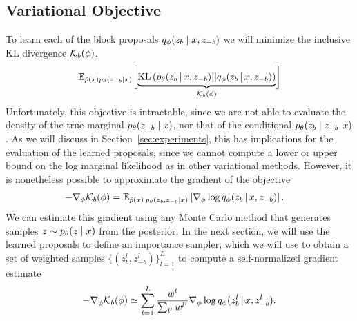 \documentclass{article}
\theoremstyle{definition}
\begin{document}
\subsection{Variational Objective} 
To learn each of the block proposals $q_\phi(z_b \mid x, z_{-b})$ we will minimize the inclusive KL divergence $\mathcal{K}_b(\phi)$.
\begin{align}
    \mathbb{E}_{\hat{p}(x)p_\theta(z_{-b} | x)}
    \biggl[
    \underbrace{
        \text{KL}\left(
            p_\theta(z_{b}\, |\, x, z_{-b})
            ||
            q_\phi(z_{b}\, |\, x, z_{-b})
        \right)
    }_{\mathcal{K}_b(\phi)}
    \biggr]
    \label{eq:variational_objective}
\end{align}
Unfortunately, this objective is intractable, since we are not able to evaluate the density of the true marginal $p_\theta(z_{-b} \mid x)$, nor that of the conditional $p_\theta(z_{b} \mid z_{-b}, x)$. 
As we will discuss in Section~\ref{sec:experiments}, this has implications for the evaluation of the learned proposals, since we cannot compute a lower or upper bound on the log marginal likelihood as in other variational methods. However, it is nonetheless possible to approximate the gradient of the objective 
\begin{align*}
    -\nabla_\phi \mathcal{K}_b(\phi)
    &=
    \mathbb{E}_{
    \hat{p}(x) \:
    p_\theta(z_{b}, z_{-b} | x)
    }
    \left[
    \nabla_\phi
    \log q_\phi(z_{b} \,|\, x, z_{-b})
    \right].
\end{align*}
We can estimate this gradient using any Monte Carlo method that generates samples $z \sim p_\theta(z \mid x)$ from the posterior. In the next section, we will use the learned proposals to define an importance sampler, which we will use to obtain a set of weighted samples $\{(z^l_b, z^l_{-b})\}_{l=1}^L$ to compute a self-normalized gradient estimate
\begin{align}
    \label{eq:grad-self-normalized}
    -\nabla_\phi \mathcal{K}_b(\phi)
    \simeq
    \sum_{l=1}^L
    \frac{w^l}{\sum_{l'} w^{l'}}
    \nabla_\phi
    \log q_\phi(z^l_{b} \,|\, x, z^l_{-b}).
\end{align}
\end{document}
